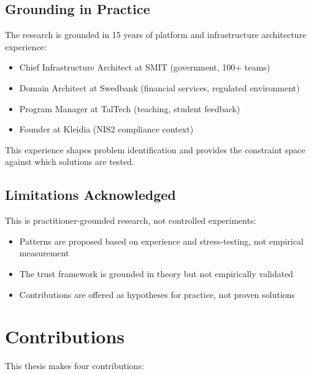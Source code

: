 \subsection{Grounding in Practice}
\label{subsec:grounding-practice}

The research is grounded in 15 years of platform and infrastructure architecture experience:
\begin{itemize}
    \item Chief Infrastructure Architect at SMIT (government, 100+ teams)
    \item Domain Architect at Swedbank (financial services, regulated environment)
    \item Program Manager at TalTech (teaching, student feedback)
    \item Founder at Kleidia (NIS2 compliance context)
\end{itemize}

This experience shapes problem identification and provides the constraint space against which solutions are tested.

\subsection{Limitations Acknowledged}
\label{subsec:limitations-acknowledged}

This is practitioner-grounded research, not controlled experiments:
\begin{itemize}
    \item Patterns are proposed based on experience and stress-testing, not empirical measurement
    \item The trust framework is grounded in theory \citep{mayer1995} but not empirically validated
    \item Contributions are offered as hypotheses for practice, not proven solutions
\end{itemize}

\section{Contributions}
\label{sec:contributions}

This thesis makes four contributions:


